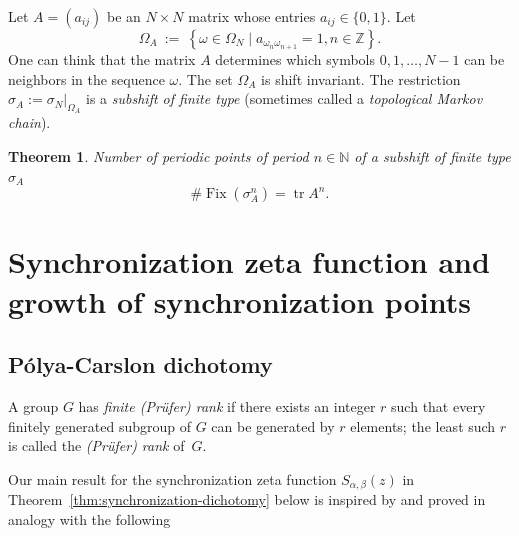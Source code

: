 \documentclass[oneside]{amsart}
\def\N{\mathbb{N}}
\def\Z{\mathbb{Z}}
\def\Fix{\operatorname{Fix}}
\def\tr{\operatorname{tr}}
\newtheorem{thm}{Theorem}
\begin{document}
Let $A = (a_{ij})$ be an $N \times N$ matrix whose entries $a_{ij} \in \{0,1\}$.
Let
\begin{equation*}
  \Omega_A \ := \ \left\{ \omega \in \Omega_N \; | \; a_{\omega_n\omega_{n+1}} = 1, n \in \Z \right\}.
\end{equation*}
One can think that the matrix $A$ determines which symbols $0,1,\ldots,N-1$ can be neighbors
in the sequence $\omega$.
The set $\Omega_A$ is shift invariant.
The restriction $\sigma_A := \left. \sigma_N \right|_{\Omega_A}$ is a \emph{subshift of finite type}
(sometimes called a \emph{topological Markov chain}).

\begin{thm}  \cite{BowLan}\label{thm:trace-formula-for-subshifts}
   Number of periodic points of period $n \in \N$ of a subshift of finite type $\sigma_A$
  \begin{equation*}
    \#\Fix(\sigma_A^n) = \tr A^n.
  \end{equation*}
\end{thm}







\vspace{1cm}
\bigskip

\section{Synchronization zeta function and growth of synchronization points} \label{sec:dichotomy}


\subsection{P\'olya-Carslon dichotomy}
A group $G$ has
\emph{finite (Pr\"ufer) rank} if there exists an integer $r$ such that
every finitely generated subgroup of $G$ can be generated by $r$
elements; the least such $r$ is called the \emph{(Pr\"ufer) rank}
of~$G$.

Our main result for the synchronization zeta function $S_{\alpha, \beta}(z)$
in Theorem~\ref{thm:synchronization-dichotomy} below
is inspired by and proved in analogy with the following
\end{document}
